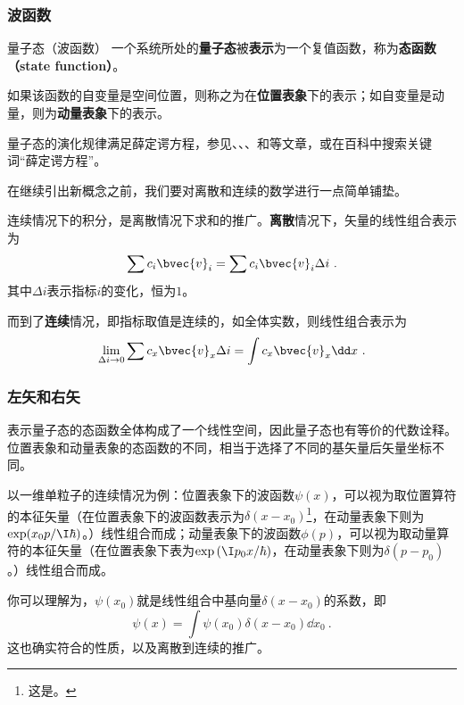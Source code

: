 \subsubsection{波函数}

\begin{definition}{量子态（波函数）}\label{def_QMPrcp_6}
一个系统所处的\textbf{量子态}被\textbf{表示}为一个复值函数，称为\textbf{态函数（state function）}。

如果该函数的自变量是空间位置，则称之为在\textbf{位置表象}下的表示；如自变量是动量，则为\textbf{动量表象}下的表示。
\end{definition}

量子态的演化规律满足薛定谔方程，参见、、、和等文章，或在百科中搜索关键词“薛定谔方程”。

在继续引出新概念之前，我们要对离散和连续的数学进行一点简单铺垫。

连续情况下的积分，是离散情况下求和的推广。\textbf{离散}情况下，矢量的线性组合表示为
\begin{equation}
\sum c_i\bvec{v}_i = \sum c_i\bvec{v}_i \Delta i~.
\end{equation}
其中$\Delta i$表示指标$i$的变化，恒为$1$。

而到了\textbf{连续}情况，即指标取值是连续的，如全体实数，则线性组合表示为
\begin{equation}
\lim\limits_{\Delta i\to 0}\sum c_x\bvec{v}_x \Delta i=\int c_x\bvec{v}_x \dd x~.
\end{equation}


\subsubsection{左矢和右矢}

表示量子态的态函数全体构成了一个线性空间，因此量子态也有等价的代数诠释。位置表象和动量表象的态函数的不同，相当于选择了不同的基矢量后矢量坐标不同。

以一维单粒子的连续情况为例：位置表象下的波函数$\psi(x)$，可以视为取位置算符的本征矢量（在位置表象下的波函数表示为$\delta(x-x_0)$\footnote{这是。}，在动量表象下则为$\exp(x_0p/\I\hbar)$。）线性组合而成；动量表象下的波函数$\phi(p)$，可以视为取动量算符的本征矢量（在位置表象下表为$\exp{(\I p_0 x/\hbar)}$，在动量表象下则为$\delta(p-p_0)$。）线性组合而成。

你可以理解为，$\psi(x_0)$就是线性组合中基向量$\delta(x-x_0)$的系数，即
\begin{equation}\label{eq_QMPrcp_7}
\psi(x) = \int \psi(x_0)\delta(x-x_0)\dd x_0~.
\end{equation}
这也确实符合的性质，以及离散到连续的推广。

